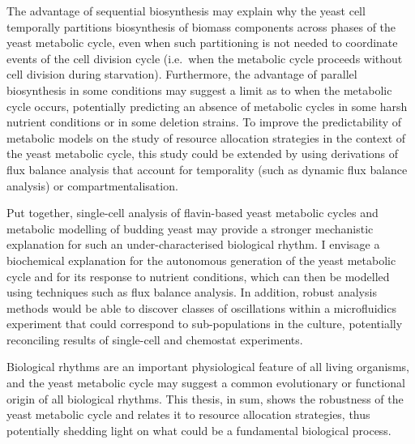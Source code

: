 The advantage of sequential biosynthesis may explain why the yeast cell temporally partitions biosynthesis of biomass components across phases of the yeast metabolic cycle, even when such partitioning is not needed to coordinate events of the cell division cycle (i.e.\ when the metabolic cycle proceeds without cell division during starvation).
Furthermore, the advantage of parallel biosynthesis in some conditions may suggest a limit as to when the metabolic cycle occurs, potentially predicting an absence of metabolic cycles in some harsh nutrient conditions or in some deletion strains.
To improve the predictability of metabolic models on the study of resource allocation strategies in the context of the yeast metabolic cycle, this study could be extended by using derivations of flux balance analysis that account for temporality (such as dynamic flux balance analysis) or compartmentalisation.

Put together, single-cell analysis of flavin-based yeast metabolic cycles and metabolic modelling of budding yeast may provide a stronger mechanistic explanation for such an under-characterised biological rhythm.
I envisage a biochemical explanation for the autonomous generation of the yeast metabolic cycle and for its response to nutrient conditions, which can then be modelled using techniques such as flux balance analysis.
In addition, robust analysis methods would be able to discover classes of oscillations within a microfluidics experiment that could correspond to sub-populations in the culture, potentially reconciling results of single-cell and chemostat experiments.

Biological rhythms are an important physiological feature of all living organisms, and the yeast metabolic cycle may suggest a common evolutionary or functional origin of all biological rhythms.
This thesis, in sum, shows the robustness of the yeast metabolic cycle and relates it to resource allocation strategies, thus potentially shedding light on what could be a fundamental biological process.
